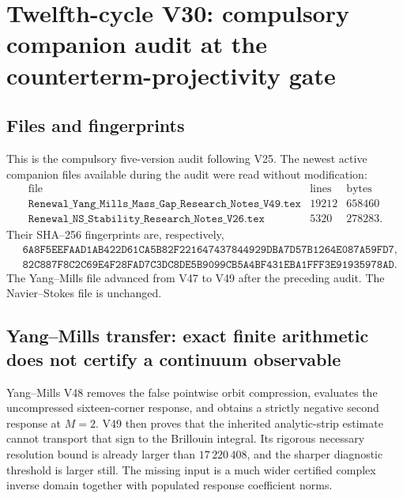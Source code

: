 \documentclass[11pt]{article}
\theoremstyle{remark}
\begin{document}

\section{Twelfth-cycle V30: compulsory companion audit at the
counterterm-projectivity gate}
\label{sec:v12v30}

\subsection{Files and fingerprints}

This is the compulsory five-version audit following V25.  The newest
active companion files available during the audit were read without
modification:
\[
\begin{array}{c|r|r}
\text{file}&\text{lines}&\text{bytes}\\ \hline
\texttt{Renewal\_Yang\_Mills\_Mass\_Gap\_Research\_Notes\_V49.tex}
 &19212&658460\\
\texttt{Renewal\_NS\_Stability\_Research\_Notes\_V26.tex}
 &5320&278283.
\end{array}                                                   \tag{30.1}
\]
Their SHA--256 fingerprints are, respectively,
\[
\begin{split}
 &\texttt{6A8F5EEFAAD1AB422D61CA5B82F221647437844929DBA7D57B1264E087A59FD7},
 \\
 &\texttt{82C887F8C2C69E4F28FAD7C3DC8DE5B9099CB5A4BF431EBA1FFF3E91935978AD}.
\end{split}                                                   \tag{30.2}
\]
The Yang--Mills file advanced from V47 to V49 after the preceding
audit.  The Navier--Stokes file is unchanged.

\subsection{Yang--Mills transfer: exact finite arithmetic does not
certify a continuum observable}

Yang--Mills V48 removes the false pointwise orbit compression,
evaluates the uncompressed sixteen-corner response, and obtains a
strictly negative second response at \(M=2\).  V49 then proves that
the inherited analytic-strip estimate cannot transport that sign to
the Brillouin integral.  Its rigorous necessary resolution bound is
already larger than \(17\,220\,408\), and the sharper diagnostic
threshold is larger still.  The missing input is a much wider
certified complex inverse domain together with populated response
coefficient norms.
\end{document}

